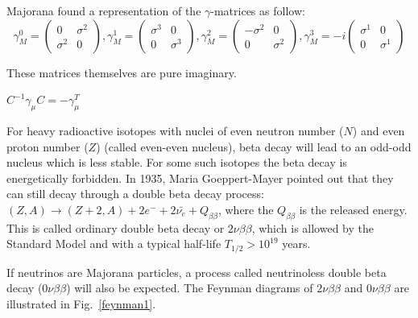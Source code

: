 Majorana found a representation of the $\gamma$-matrices as follow:
\[
\gamma_M^0 = \begin{pmatrix} 
0 & \sigma^2 \\
\sigma^2 & 0
\end{pmatrix},
\gamma_M^1 = \begin{pmatrix} 
\sigma^3 & 0 \\
0 & \sigma^3
\end{pmatrix},
\gamma_M^2 = \begin{pmatrix} 
-\sigma^2 & 0 \\
0 & \sigma^2
\end{pmatrix},
\gamma_M^3 = -i\begin{pmatrix} 
\sigma^1 & 0 \\
0 & \sigma^1
\end{pmatrix}
\]

These matrices themselves are pure imaginary. 

$C^{-1}\gamma_\mu C=-\gamma_\mu^T$




For heavy radioactive isotopes with nuclei of even neutron number ($N$) and even proton number ($Z$) (called even-even nucleus), beta decay will lead to an odd-odd nucleus which is less stable. For some such isotopes the beta decay is energetically forbidden. In 1935, Maria Goeppert-Mayer pointed out that they can still decay through a double beta decay process: $(Z,A) \to (Z+2,A)+2e^{-}+2\bar{\nu_e}+Q_{\beta\beta}$, where the $Q_{\beta\beta}$ is the released energy. This is called ordinary double beta decay or $2\nu\beta\beta$, which is allowed by the Standard Model and with a typical half-life $T_{1/2}>10^{19}$ years\cite{martin}.

If neutrinos are Majorana particles, a process called neutrinoless double beta decay ($0\nu\beta\beta$) will also be expected. The Feynman diagrams of $2\nu\beta\beta$ and $0\nu\beta\beta$ are illustrated in Fig.~\ref{feynman1}.

